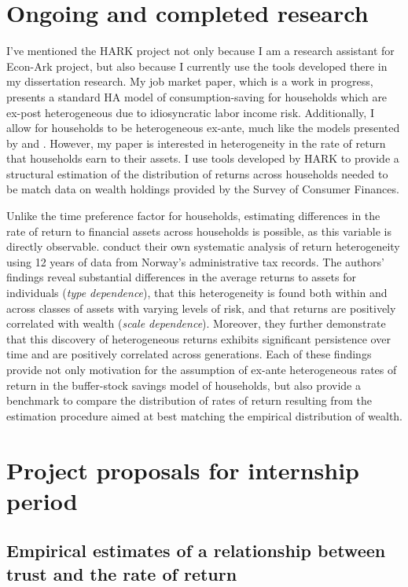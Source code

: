 \documentclass{scrartcl}
\begin{document}
\section{Ongoing and completed research}

I've mentioned the HARK project not only because I am a research assistant for Econ-Ark project, but also because I currently use the tools developed there in my dissertation research. My job market paper, which is a work in progress, presents a standard HA model of consumption-saving for households which are ex-post heterogeneous due to idiosyncratic labor income risk. Additionally, I allow for households to be heterogeneous ex-ante, much like the models presented by \cite{ks1998} and \cite{cstw2017}. However, my paper is interested in heterogeneity in the rate of return that households earn to their assets. I use tools developed by HARK to provide a structural estimation of the distribution of returns across households needed to be match data on wealth holdings provided by the Survey of Consumer Finances.

Unlike the time preference factor for households, estimating differences in the rate of return to financial assets across households is possible, as this variable is directly observable. \cite{aflgdmlp20} conduct their own systematic analysis of return heterogeneity using 12 years of data from Norway's administrative tax records. The authors' findings reveal substantial differences in the average returns to assets for individuals (\textit{type dependence}), that this heterogeneity is found both within and across classes of assets with varying levels of risk, and that returns are positively correlated with wealth  (\textit{scale dependence}). Moreover, they further demonstrate that this discovery of heterogeneous returns exhibits significant persistence over time and are positively correlated across generations. Each of these findings provide not only motivation for the assumption of ex-ante heterogeneous rates of return in the buffer-stock savings model of households, but also provide a benchmark to compare the distribution of rates of return resulting from the estimation procedure aimed at best matching the empirical distribution of wealth.

\section{Project proposals for internship period}

\subsection{Empirical estimates of a relationship between trust and the rate of return}
\end{document}
